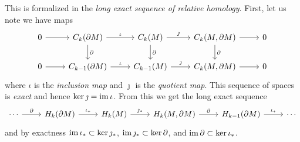 \documentclass{article}
\begin{document}
This is formalized in the \emph{long exact sequence of relative homology}. First, let us note we have maps
\[
\begin{tikzcd}
0 \arrow[r] & C_k(\boundary) \arrow[r, "\iota"] \arrow[d, "\partial"] & C_k(M) \arrow[r, "\jmath"] \arrow[d, "\partial"] & {C_k(M,\boundary)} \arrow[r] \arrow[d, "\partial"] & 0 \\
0 \arrow[r] & C_{k-1}(\boundary) \arrow[r, "\iota"]                   & C_{k-1}(M) \arrow[r, "\jmath"]                   & {C_k(M,\boundary)} \arrow[r]                       & 0
\end{tikzcd}
\]
where $\iota$ is the \emph{inclusion map} and $\jmath$ is the \emph{quotient map}. This sequence of spaces is \emph{exact} and hence $\ker \jmath = \operatorname{im} \iota$. From this we get the long exact sequence
\[
\begin{tikzcd}
\cdots \arrow[r, "\partial"] & H_k(\boundary) \arrow[r, "\iota_*"] & H_{k}(M) \arrow[r, "\jmath_*"] & {H_k(M,\boundary)} \arrow[r, "\partial"] & H_{k-1}(\boundary) \arrow[r, "\iota_*"] & \cdots
\end{tikzcd}
\]
and by exactness $\operatorname{im} \iota_* \subset \ker \jmath_*$, $\operatorname{im} \jmath_* \subset \ker \partial$, and $\operatorname{im} \partial \subset \ker \iota_*$.
\end{document}
